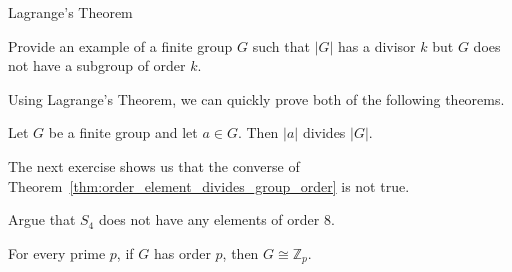 \begin{section}{Lagrange's Theorem}
\begin{problem}
Provide an example of a finite group $G$ such that $|G|$ has a divisor $k$ but $G$ does not have a subgroup of order $k$.
\end{problem}

%

Using Lagrange's Theorem, we can quickly prove both of the following theorems.

\begin{theorem}\label{thm:order_element_divides_group_order}
Let $G$ be a finite group and let $a\in G$.  Then $|a|$ divides $|G|$.
\end{theorem}

The next exercise shows us that the converse of Theorem~\ref{thm:order_element_divides_group_order} is not true.

\begin{problem}
Argue that $S_4$ does not have any elements of order 8.
\end{problem}

\begin{theorem}
For every prime $p$, if $G$ has order $p$, then $G\cong \mathbb{Z}_p$.
\end{theorem}


\end{section}
